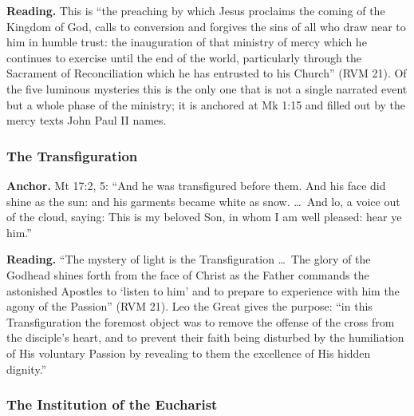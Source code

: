 \textbf{Reading.} This is ``the preaching by which Jesus proclaims the
coming of the Kingdom of God, calls to conversion and forgives the sins
of all who draw near to him in humble trust: the inauguration of that
ministry of mercy which he continues to exercise until the end of the
world, particularly through the Sacrament of Reconciliation which he has
entrusted to his Church'' (RVM 21). Of the five luminous mysteries this
is the only one that is not a single narrated event but a whole phase of
the ministry; it is anchored at Mk 1:15 and filled out by the mercy
texts John Paul II names.

\subsubsection{The Transfiguration}

\textbf{Anchor.} Mt 17:2, 5: ``And he was transfigured before them. And
his face did shine as the sun: and his garments became white as snow.
\ldots\ And lo, a voice out of the cloud, saying: This is my beloved
Son, in whom I am well pleased: hear ye him.''

\textbf{Reading.} ``The mystery of light  is the
Transfiguration \ldots\ The glory of the Godhead shines forth from the
face of Christ as the Father commands the astonished Apostles to `listen
to him' and to prepare to experience with him the agony of the Passion''
(RVM 21). Leo the Great gives the purpose: ``in this Transfiguration the
foremost object was to remove the offense of the cross from the
disciple's heart, and to prevent their faith being disturbed by the
humiliation of His voluntary Passion by revealing to them the excellence
of His hidden dignity.''

\subsubsection{The Institution of the Eucharist}

